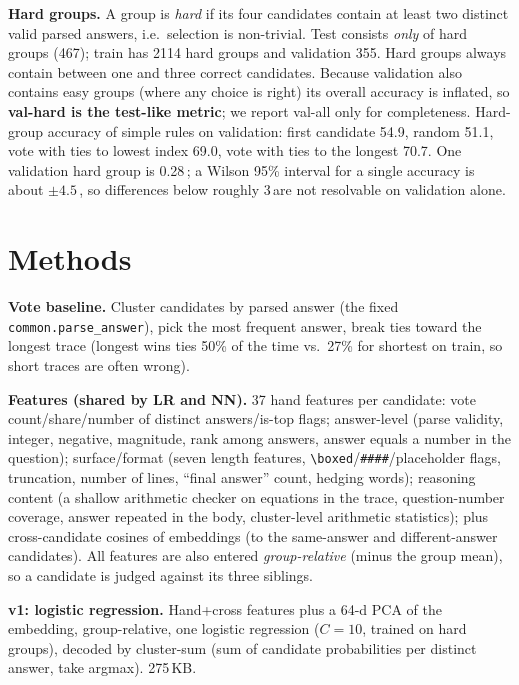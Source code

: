\documentclass[10pt,a4paper]{article}
\newcommand{\pt}{\,\text{pt}}
\begin{document}
\textbf{Hard groups.} A group is \emph{hard} if its four candidates contain at least two distinct valid parsed answers, i.e.\ selection is non-trivial. Test consists \emph{only} of hard groups (467); train has 2114 hard groups and validation 355. Hard groups always contain between one and three correct candidates. Because validation also contains easy groups (where any choice is right) its overall accuracy is inflated, so \textbf{val-hard is the test-like metric}; we report val-all only for completeness. Hard-group accuracy of simple rules on validation: first candidate 54.9, random 51.1, vote with ties to lowest index 69.0, vote with ties to the longest 70.7. One validation hard group is 0.28\pt; a Wilson 95\% interval for a single accuracy is about $\pm4.5$\pt, so differences below roughly 3\pt are not resolvable on validation alone.

\section{Methods}
\textbf{Vote baseline.} Cluster candidates by parsed answer (the fixed \texttt{common.parse\_answer}), pick the most frequent answer, break ties toward the longest trace (longest wins ties 50\% of the time vs.\ 27\% for shortest on train, so short traces are often wrong).

\textbf{Features (shared by LR and NN).} 37 hand features per candidate: vote count/share/number of distinct answers/is-top flags; answer-level (parse validity, integer, negative, magnitude, rank among answers, answer equals a number in the question); surface/format (seven length features, \verb|\boxed|/\verb|####|/placeholder flags, truncation, number of lines, ``final answer'' count, hedging words); reasoning content (a shallow arithmetic checker on equations in the trace, question-number coverage, answer repeated in the body, cluster-level arithmetic statistics); plus cross-candidate cosines of embeddings (to the same-answer and different-answer candidates). All features are also entered \emph{group-relative} (minus the group mean), so a candidate is judged against its three siblings.

\textbf{v1: logistic regression.} Hand+cross features plus a 64-d PCA of the embedding, group-relative, one logistic regression ($C=10$, trained on hard groups), decoded by cluster-sum (sum of candidate probabilities per distinct answer, take argmax). 275\,KB.
\end{document}
